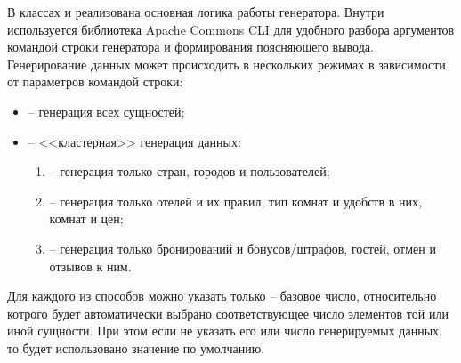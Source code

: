 В классах  и  реализована основная логика работы генератора. Внутри  используется библиотека Apache Commons CLI для удобного разбора аргументов командой строки генератора и формирования поясняющего вывода. Генерирование данных может происходить в нескольких режимах в зависимости от параметров командой строки:
\begin{itemize}
	\item {} -- генерация всех сущностей;
	\item {} -- <<кластерная>> генерация данных:
		\begin{enumerate}
			\item {} -- генерация только стран, городов и пользователей;
			\item {} -- генерация только отелей и их правил, тип комнат и удобств в них, комнат и цен;
			\item {} -- генерация только бронирований и бонусов/штрафов, гостей, отмен и отзывов к ним.
		\end{enumerate}
\end{itemize}

Для каждого из способов можно указать только  -- базовое число, относительно котрого будет автоматически выбрано соответствующее число элементов той или иной сущности. При этом если не указать его или число генерируемых данных, то будет использовано значение по умолчанию.


